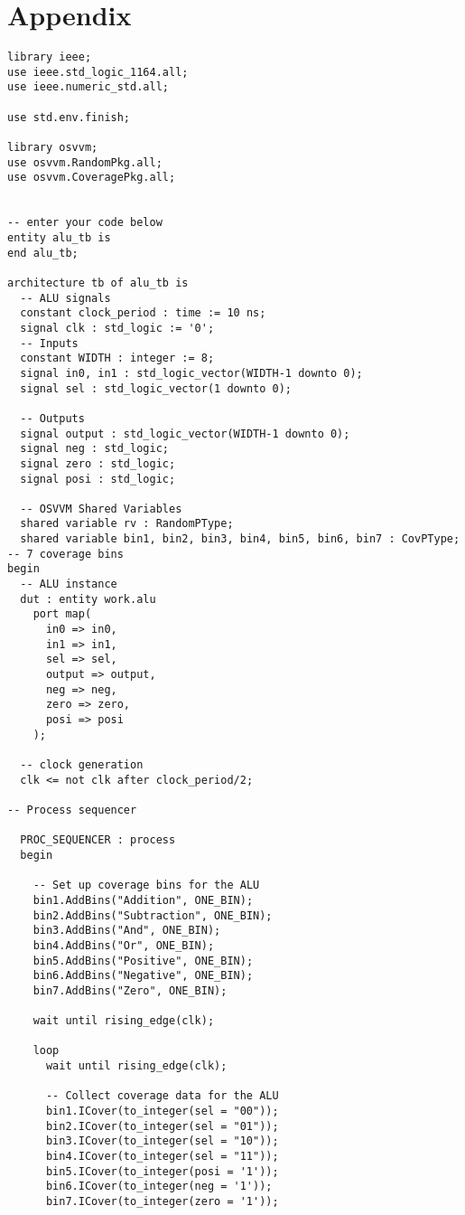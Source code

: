 \documentclass{article}
\begin{document}
\section*{Appendix}
\begin{lstlisting}[caption=ALU Testbench, label=lst:alu-tb]
library ieee;
use ieee.std_logic_1164.all;
use ieee.numeric_std.all;

use std.env.finish;

library osvvm;
use osvvm.RandomPkg.all;
use osvvm.CoveragePkg.all;


-- enter your code below
entity alu_tb is 
end alu_tb;

architecture tb of alu_tb is 
  -- ALU signals
  constant clock_period : time := 10 ns;
  signal clk : std_logic := '0';
  -- Inputs
  constant WIDTH : integer := 8;
  signal in0, in1 : std_logic_vector(WIDTH-1 downto 0);
  signal sel : std_logic_vector(1 downto 0);

  -- Outputs
  signal output : std_logic_vector(WIDTH-1 downto 0);
  signal neg : std_logic;
  signal zero : std_logic;
  signal posi : std_logic;

  -- OSVVM Shared Variables
  shared variable rv : RandomPType;
  shared variable bin1, bin2, bin3, bin4, bin5, bin6, bin7 : CovPType; -- 7 coverage bins
begin 
  -- ALU instance
  dut : entity work.alu 
    port map(
      in0 => in0,
      in1 => in1,
      sel => sel,
      output => output,
      neg => neg,
      zero => zero,
      posi => posi
    );

  -- clock generation
  clk <= not clk after clock_period/2;

-- Process sequencer

  PROC_SEQUENCER : process
  begin

    -- Set up coverage bins for the ALU
    bin1.AddBins("Addition", ONE_BIN);
    bin2.AddBins("Subtraction", ONE_BIN);
    bin3.AddBins("And", ONE_BIN);
    bin4.AddBins("Or", ONE_BIN);
    bin5.AddBins("Positive", ONE_BIN);
    bin6.AddBins("Negative", ONE_BIN);
    bin7.AddBins("Zero", ONE_BIN);

    wait until rising_edge(clk);

    loop
      wait until rising_edge(clk);

      -- Collect coverage data for the ALU
      bin1.ICover(to_integer(sel = "00"));
      bin2.ICover(to_integer(sel = "01"));
      bin3.ICover(to_integer(sel = "10"));
      bin4.ICover(to_integer(sel = "11"));
      bin5.ICover(to_integer(posi = '1'));
      bin6.ICover(to_integer(neg = '1'));
      bin7.ICover(to_integer(zero = '1'));


\end{lstlisting}
\end{document}
